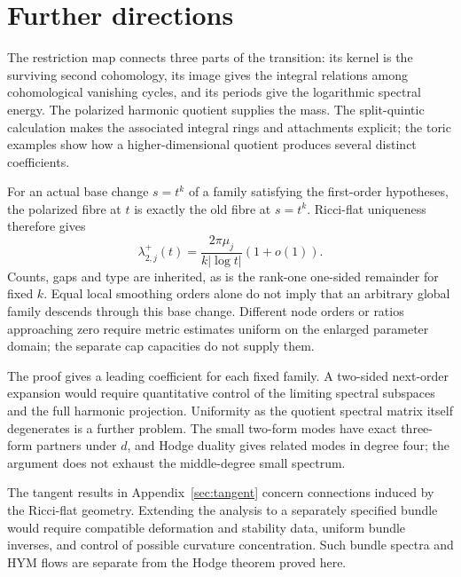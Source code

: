 \section{Further directions}\label{sec:further}

The restriction map connects three parts of the transition: its kernel is
the surviving second cohomology, its image gives the integral relations
among cohomological vanishing cycles, and its periods give the logarithmic
spectral energy. The polarized harmonic quotient supplies the mass.
The split-quintic calculation makes the associated integral rings and
attachments explicit; the toric examples show how a higher-dimensional
quotient produces several distinct coefficients.

For an actual base change $s=t^k$ of a family satisfying the first-order
hypotheses, the polarized fibre at $t$ is exactly the old fibre at $s=t^k$.
Ricci-flat uniqueness therefore gives
\[
 \lambda^+_{2,j}(t)=\frac{2\pi\mu_j}{k|\log t|}(1+o(1)).
\]
Counts, gaps and type are inherited, as is the rank-one one-sided remainder
for fixed $k$. Equal local smoothing orders alone do not imply that an
arbitrary global family descends through this base change. Different node
orders or ratios approaching zero require metric estimates uniform on the
enlarged parameter domain; the separate cap capacities do not supply them.

The proof gives a leading coefficient for each fixed family. A two-sided
next-order expansion would require quantitative control of the limiting
spectral subspaces and the full harmonic projection. Uniformity as the
quotient spectral matrix itself degenerates is a further problem.
The small two-form modes have exact three-form partners under $d$, and
Hodge duality gives related modes in degree four; the argument does not
exhaust the middle-degree small spectrum.

The tangent results in Appendix~\ref{sec:tangent} concern connections
induced by the Ricci-flat geometry. Extending the analysis to a separately
specified bundle would require compatible deformation and stability data,
uniform bundle inverses, and control of possible curvature concentration.
Such bundle spectra and HYM flows are separate from the Hodge theorem
proved here.
